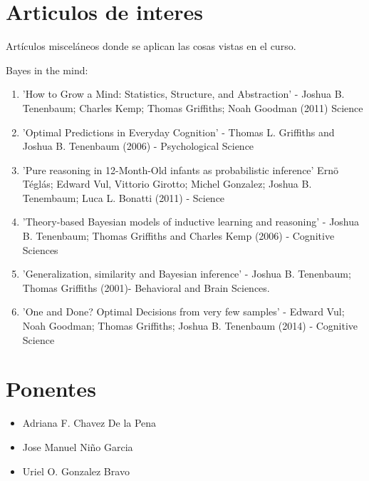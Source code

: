 \documentclass[
10pt, %
a4paper, %
twocolumn, %
landscape %
]{article}
\begin{document}

\section{Articulos de interes}

Artículos misceláneos donde se aplican las cosas vistas en el curso.


Bayes in the mind:


\begin{enumerate}
\item 'How to Grow a Mind: Statistics, Structure, and Abstraction' - Joshua B. Tenenbaum; Charles Kemp; Thomas Griffiths; Noah Goodman (2011) Science

\item 'Optimal Predictions in Everyday Cognition' - Thomas L. Griffiths and Joshua B. Tenenbaum (2006) - Psychological Science

\item 'Pure reasoning in 12-Month-Old infants as probabilistic inference' Ernö Téglás; Edward Vul, Vittorio Girotto; Michel Gonzalez; Joshua B. Tenembaum; Luca L. Bonatti (2011) - Science

\item 'Theory-based Bayesian models of inductive learning and reasoning' - Joshua B. Tenenbaum; Thomas Griffiths and Charles Kemp (2006) - Cognitive Sciences

\item 'Generalization, similarity and Bayesian inference' - Joshua B. Tenenbaum; Thomas Griffiths (2001)- Behavioral and Brain Sciences.

\item 'One and Done? Optimal Decisions from very few samples' - Edward Vul; Noah Goodman; Thomas Griffiths; Joshua B. Tenenbaum (2014) -  Cognitive Science
\end{enumerate}

\section*{Ponentes}

\begin{itemize}
\item Adriana F. Chavez De la Pena
\item Jose Manuel Niño Garcia
\item Uriel O. Gonzalez Bravo
\end{itemize}

\renewcommand{\refname}{Reference} %


\end{document}
